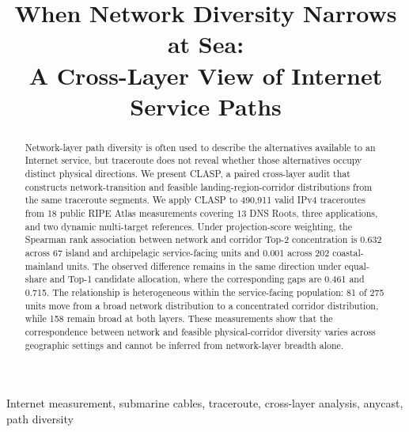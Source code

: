 \documentclass[10pt,conference,letterpaper]{IEEEtran}
\begin{document}
\title{When Network Diversity Narrows at Sea:\\
A Cross-Layer View of Internet Service Paths}

\author{}

\maketitle

\begin{abstract}
Network-layer path diversity is often used to describe the alternatives
available to an Internet service, but traceroute does not reveal whether those
alternatives occupy distinct physical directions. We present CLASP, a paired
cross-layer audit that constructs network-transition and feasible
landing-region-corridor distributions from the same traceroute segments. We
apply CLASP to 490,911 valid IPv4 traceroutes from 18 public RIPE Atlas
measurements covering 13 DNS Roots, three applications, and two dynamic
multi-target references. Under projection-score weighting, the Spearman rank
association between network and corridor Top-2 concentration is 0.632 across
67 island and archipelagic service-facing units and 0.001 across 202 coastal-
mainland units. The observed difference remains in the same direction under
equal-share and Top-1 candidate allocation, where the corresponding gaps are
0.461 and 0.715. The relationship is heterogeneous within the service-facing
population: 81 of 275 units move from a broad network distribution to a
concentrated corridor distribution, while 158 remain broad at both layers.
These measurements show that the correspondence between network and feasible
physical-corridor diversity varies across geographic settings and cannot be
inferred from network-layer breadth alone.
\end{abstract}

\begin{IEEEkeywords}
Internet measurement, submarine cables, traceroute, cross-layer analysis,
anycast, path diversity
\end{IEEEkeywords}













\end{document}
